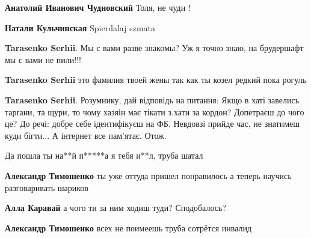 \begin{itemize}
\begin{itemize}
\textbf{Анатолий Иванович Чудновский} Толя, не чуди !

\textbf{Натали Кульчинская} Spierdalaj szmata

\textbf{Tarasenko Serhii}. Мы с вами разве знакомы? Уж я точно знаю, на брудершафт мы с вами не пили!!!

\textbf{Tarasenko Serhii} это фамилия твоей жены так как ты козел редкий пока рогуль

\textbf{Tarasenko Serhii}. Розумнику, дай відповідь на питання:
Якщо в хаті завелись тарґани, та щури, то чому хазяін має тікати з.хати за кордон?
Допетраєш до чого це?
До речі: добре себе ідентифікуєш на ФБ. Невдовзі прийде час, не знатимеш куди бігти...
А інтернет все пам'ятає.
Отож.
\end{itemize}

Да пошла ты на**й п*****а я тебя и**л, труба шатал

\begin{itemize}
\textbf{Александр Тимошенко} ты уже оттуда пришел понравилось а теперь научись разговаривать шариков

\textbf{Алла Каравай} а чого ти за ним ходиш туди? Сподобалось?

\textbf{Александр Тимошенко} всех не поимеешь труба сотрётся инвалид
\end{itemize}

\end{itemize}

